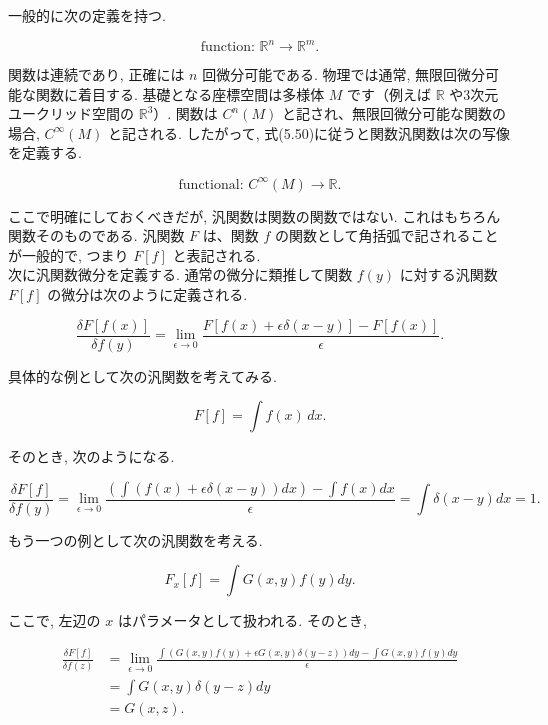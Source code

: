 \documentclass{jsarticle}
\begin{document}
一般的に次の定義を持つ.

\begin{equation*}
\text{function: } \mathbb{R}^n \rightarrow \mathbb{R}^m. \tag{5.53}
\end{equation*}

関数は連続であり, 正確には $ n $ 回微分可能である. 物理では通常, 無限回微分可能な関数に着目する. 基礎となる座標空間は多様体 $ M $ です（例えば $ \mathbb{R} $ や3次元ユークリッド空間の $ \mathbb{R}^3 $）. 関数は $ C^n(M) $ と記され、無限回微分可能な関数の場合, $ C^\infty(M) $ と記される. したがって, 式(5.50)に従うと関数汎関数は次の写像を定義する.

\begin{equation*}
\text{functional: } C^\infty(M) \rightarrow \mathbb{R}. \tag{5.54}
\end{equation*}

ここで明確にしておくべきだが, 汎関数は関数の関数ではない. これはもちろん関数そのものである. 汎関数 $ F $ は、関数 $ f $ の関数として角括弧で記されることが一般的で, つまり $ F[f] $ と表記される.\\

次に汎関数微分を定義する. 通常の微分に類推して関数 $ f(y) $ に対する汎関数 $ F[f] $ の微分は次のように定義される.

\begin{equation*}
\frac{\delta F[f(x)]}{\delta f(y)} = \lim_{\epsilon \to 0} \frac{F[f(x) + \epsilon \delta(x - y)] - F[f(x)]}{\epsilon}. \tag{5.55}
\end{equation*}

具体的な例として次の汎関数を考えてみる.

\begin{equation*}
F[f] = \int f(x) \, dx. \tag{5.56}
\end{equation*}

そのとき, 次のようになる.

\begin{equation*}
\frac{\delta F[f]}{\delta f(y)} = \lim_{\epsilon \to 0} \frac{\left( \int \left( f(x) + \epsilon \delta(x - y) \right) dx \right) - \int f(x) dx}{\epsilon}
= \int \delta(x - y) dx = 1. \tag{5.57}
\end{equation*}

もう一つの例として次の汎関数を考える.

\begin{equation*}
F_x[f] = \int G(x, y) f(y) dy. \tag{5.58}
\end{equation*}

ここで, 左辺の $ x $ はパラメータとして扱われる. そのとき,

\begin{align*}
\frac{\delta F[f]}{\delta f(z)} 
&= \lim_{\epsilon \to 0} \frac{\int \left( G(x, y) f(y) + \epsilon G(x, y) \delta(y - z) \right) dy - \int G(x, y) f(y) dy}{\epsilon} \\
&= \int G(x, y) \delta(y - z) dy \\
&= G(x, z). \tag{5.59}
\end{align*}
\end{document}
